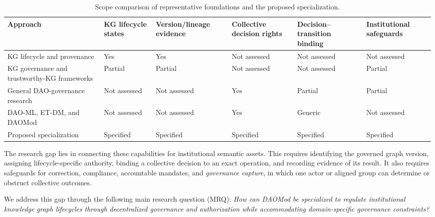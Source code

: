 \documentclass[journal]{IEEEtran}
\begin{document}
\begin{table}[t]
\centering
\caption{Scope comparison of representative foundations and
the proposed specialization.}
\label{tab:novelty_comparison}
\renewcommand{\arraystretch}{1.12}
\setlength{\tabcolsep}{3pt}
\begin{tabular}{
    p{3.8cm}
    p{2.35cm}
    p{2.45cm}
    p{2.45cm}
    p{2.65cm}
    p{2.35cm}
}
\toprule
\textbf{Approach} &
\textbf{KG lifecycle states} &
\textbf{Version/lineage evidence} &
\textbf{Collective decision rights} &
\textbf{Decision--transition binding} &
\textbf{Institutional safeguards}\\
\midrule

KG lifecycle and provenance
\cite{Moreau2013PROV,Lebo2013PROVO,Geisler2025KGLifecycle,Dibowski2024TraceabilityKG}
& Yes & Yes & Not assessed & Not assessed & Not assessed\\

KG governance and trustworthy-KG frameworks
\cite{MeronoPenuela2025KGgov,Zhang2025TrustworthyKG,Schwabe2020KGTrustGovernance}
& Partial & Partial & Not assessed & Not assessed & Partial\\

General DAO-governance research
\cite{FaqirRhazoui2020DAOOverview,Hassan2021DAO,Han2025DAOReview}
& Not assessed & Not assessed & Yes & Partial & Partial\\

DAO-ML, ET-DM, and DAOMod
\cite{Avanzo2024DAOML,Avanzo2025ETDM,Avanzo2025DAOMod,Avanzo2025DAOMLtoSolidity,Avanzo2025Thesis}
& Not assessed & Not assessed & Yes & Generic & Not assessed\\

Proposed specialization
& Specified & Specified & Specified & Specified & Specified\\

\bottomrule
\end{tabular}
\end{table}

The research gap lies in connecting these capabilities for
institutional semantic assets. This requires identifying the
governed graph version, assigning lifecycle-specific authority,
binding a collective decision to an exact operation, and
recording evidence of its result. It also requires safeguards
for correction, compliance, accountable mandates, and
\emph{governance capture}, in which one actor or aligned group
can determine or obstruct collective outcomes.

We address this gap through the following main research
question (MRQ):
\emph{How can DAOMod be specialized to regulate institutional
knowledge graph lifecycles through decentralized governance
and authorization while accommodating domain-specific
governance constraints?}
\end{document}

